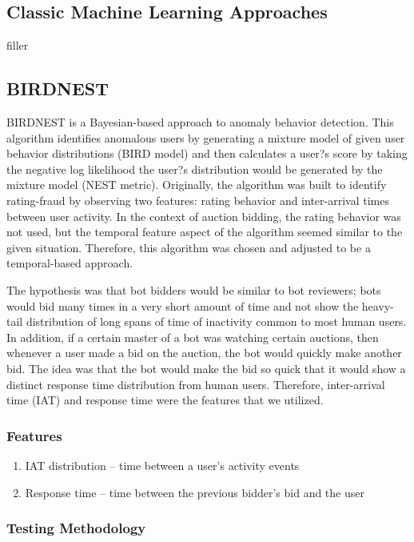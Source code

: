 \documentclass{article} %
\begin{document}
\subsection{Classic Machine Learning Approaches}

filler

\subsection{BIRDNEST}

BIRDNEST is a Bayesian-based approach to anomaly behavior detection.
This algorithm identifies anomalous users by generating a mixture model of given user behavior distributions (BIRD model) and then calculates a user?s score by taking the negative log likelihood the user?s distribution would be generated by the mixture model (NEST metric).
Originally, the algorithm was built to identify rating-fraud by observing two features: rating behavior and inter-arrival times between user activity.
In the context of auction bidding, the rating behavior was not used, but the temporal feature aspect of the algorithm seemed similar to the given situation.
Therefore, this algorithm was chosen and adjusted to be a temporal-based approach.

The hypothesis was that bot bidders would be similar to bot reviewers; bots would bid many times in a very short amount of time and not show the heavy-tail distribution of long spans of time of inactivity common to most human users.
In addition, if a certain master of a bot was watching certain auctions, then whenever a user made a bid on the auction, the bot would quickly make another bid.
The idea was that the bot would make the bid so quick that it would show a distinct response time distribution from human users.
Therefore, inter-arrival time (IAT) and response time were the features that we utilized.

\subsubsection{Features}

\begin{enumerate}
\item IAT distribution -- time between a user's activity events
\item Response time -- time between the previous bidder's bid and the user
\end{enumerate}

\subsubsection{Testing Methodology}
\end{document}
